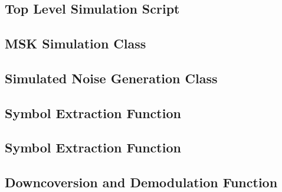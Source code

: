 \renewcommand{\thefigure}{C.\arabic{figure}}
\renewcommand{\thesection}{C.\arabic{section}}
\renewcommand{\thelstlisting}{C.\arabic{listing}}
\chapter{}
\section{Top Level Simulation Script}


\newpage
\section{MSK Simulation Class}


\newpage
\section{Simulated Noise Generation Class}


\newpage
\section{Symbol Extraction Function}


\newpage
\section{Symbol Extraction Function}


\newpage
\section{Downcoversion and Demodulation Function}
